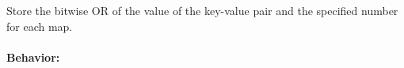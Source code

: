 Store the bitwise OR of the value of the key-value pair and the specified number
for each map.

\paragraph{Behavior:}
\begin{itemize}[noitemsep]


\end{itemize}
